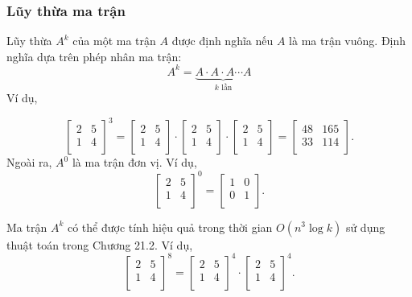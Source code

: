 \subsubsection{Lũy thừa ma trận}


Lũy thừa $A^k$ của một ma trận $A$ được định nghĩa
nếu $A$ là ma trận vuông.
Định nghĩa dựa trên phép nhân ma trận:
\[ A^k = \underbrace{A \cdot A \cdot A \cdots A}_{\textrm{$k$ lần}} \]
Ví dụ,

\[
 \begin{bmatrix}
  2 & 5 \\
  1 & 4 \\
 \end{bmatrix}^3 =
 \begin{bmatrix}
  2 & 5 \\
  1 & 4 \\
 \end{bmatrix} \cdot
 \begin{bmatrix}
  2 & 5 \\
  1 & 4 \\
 \end{bmatrix} \cdot
 \begin{bmatrix}
  2 & 5 \\
  1 & 4 \\
 \end{bmatrix} =
 \begin{bmatrix}
  48 & 165 \\
  33 & 114 \\
 \end{bmatrix}.
\]
Ngoài ra, $A^0$ là ma trận đơn vị. Ví dụ,
\[
 \begin{bmatrix}
  2 & 5 \\
  1 & 4 \\
 \end{bmatrix}^0 =
 \begin{bmatrix}
  1 & 0 \\
  0 & 1 \\
 \end{bmatrix}.
\]

Ma trận $A^k$ có thể được tính hiệu quả
trong thời gian $O(n^3 \log k)$ sử dụng
thuật toán trong Chương 21.2. Ví dụ,
\[
 \begin{bmatrix}
  2 & 5 \\
  1 & 4 \\
 \end{bmatrix}^8 =
 \begin{bmatrix}
  2 & 5 \\
  1 & 4 \\
 \end{bmatrix}^4 \cdot
 \begin{bmatrix}
  2 & 5 \\
  1 & 4 \\
 \end{bmatrix}^4.
\]

